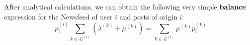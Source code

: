 \documentclass[10pt, conference, letterpaper]{IEEEtran}
\newcommand{\blue}[1]{\textcolor{blue}{#1}}
\newcommand{\red}[1]{\textcolor{red}{#1}}
\begin{document}
After analytical calculations, we can obtain the following very simple \textbf{balance} expression for the Newsfeed of user $i$ and posts of origin $i$:
\begin{equation}
\label{Cpi}
p_i^{(i)}\sum_{k\in \mathcal{L}^{(i)}}\left(\lambda^{(k)}+\mu^{(k)}\right) = \sum_{k\in \mathcal{L}^{(i)}}\mu^{(k)}p_i^{(k)}
\end{equation}

\end{document}
